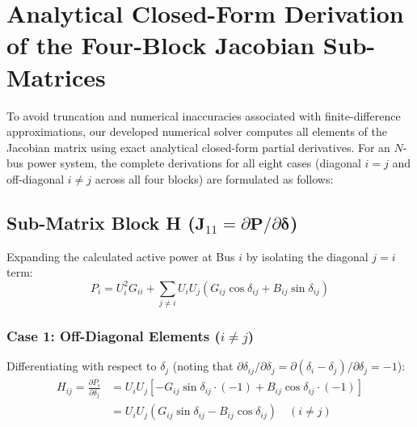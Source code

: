 \documentclass[12pt,a4paper,oneside]{report}
\begin{document}
\section{Analytical Closed-Form Derivation of the Four-Block Jacobian Sub-Matrices}
To avoid truncation and numerical inaccuracies associated with finite-difference approximations, our developed numerical solver computes all elements of the Jacobian matrix using exact analytical closed-form partial derivatives. For an $N$-bus power system, the complete derivations for all eight cases (diagonal $i=j$ and off-diagonal $i \neq j$ across all four blocks) are formulated as follows:

\subsection{Sub-Matrix Block H ($\mathbf{J}_{11} = \partial \mathbf{P} / \partial \boldsymbol{\delta}$)}
Expanding the calculated active power at Bus $i$ by isolating the diagonal $j = i$ term:
\begin{equation}
P_i = U_i^2 G_{ii} + \sum_{j \neq i} U_i U_j (G_{ij} \cos\delta_{ij} + B_{ij} \sin\delta_{ij})
\end{equation}

\subsubsection{Case 1: Off-Diagonal Elements ($i \neq j$)}
Differentiating with respect to $\delta_j$ (noting that $\partial \delta_{ij} / \partial \delta_j = \partial(\delta_i - \delta_j)/\partial \delta_j = -1$):
\begin{align}
H_{ij} = \frac{\partial P_i}{\partial \delta_j} &= U_i U_j \left[ -G_{ij} \sin\delta_{ij} \cdot (-1) + B_{ij} \cos\delta_{ij} \cdot (-1) \right] \nonumber \\
&= U_i U_j (G_{ij} \sin\delta_{ij} - B_{ij} \cos\delta_{ij}) \quad (i \neq j)
\end{align}
\end{document}
